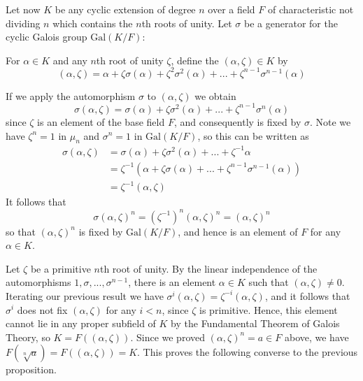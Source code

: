 Let now $K$ be any cyclic extension of degree $n$ over a field $F$ of characteristic not dividing $n$ which contains the $n$th roots of unity. Let $\sigma$ be a generator for the cyclic Galois group $\text{Gal}(K/F)$:

\begin{defn}
    For $\alpha \in K$ and any $n$th root of unity $\zeta$, define the  $(\alpha,\zeta) \in K$ by \begin{equation*}
        (\alpha,\zeta) = \alpha+\zeta\sigma(\alpha) +\zeta^2\sigma^2(\alpha)+...+\zeta^{n-1}\sigma^{n-1}(\alpha)
    \end{equation*}
\end{defn}

If we apply the automorphism $\sigma$ to $(\alpha,\zeta)$ we obtain\begin{equation*}
    \sigma(\alpha,\zeta) = \sigma(\alpha)+\zeta\sigma^2(\alpha)+...+\zeta^{n-1}\sigma^n(\alpha)
\end{equation*}
since $\zeta$ is an element of the base field $F$, and consequently is fixed by $\sigma$. Note we have $\zeta^n = 1$ in $\mu_n$ and $\sigma^n = 1$ in $\text{Gal}(K/F)$, so this can be written as \begin{align*}
    \sigma(\alpha,\zeta) &= \sigma(\alpha)+\zeta\sigma^2(\alpha)+...+\zeta^{-1}\alpha \\
    &= \zeta^{-1}(\alpha+\zeta\sigma(\alpha)+...+\zeta^{n-1}\sigma^{n-1}(\alpha)) \\
    &= \zeta^{-1}(\alpha,\zeta)
\end{align*}
It follows that \begin{equation*}
    \sigma(\alpha,\zeta)^n = (\zeta^{-1})^n(\alpha,\zeta)^n = (\alpha,\zeta)^n
\end{equation*}
so that $(\alpha,\zeta)^n$ is fixed by $\text{Gal}(K/F)$, and hence is an element of $F$ for any $\alpha \in K$.

Let $\zeta$ be a primitive $n$th root of unity. By the linear independence of the automorphisms $1,\sigma,...,\sigma^{n-1}$, there is an element $\alpha \in K$ such that $(\alpha,\zeta)\neq 0$. Iterating our previous result we have $\sigma^i(\alpha,\zeta) = \zeta^{-i}(\alpha,\zeta)$, and it follows that $\sigma^i$ does not fix $(\alpha,\zeta)$ for any $i < n$, since $\zeta$ is primitive. Hence, this element cannot lie in any proper subfield of $K$ by the Fundamental Theorem of Galois Theory, so $K = F((\alpha,\zeta))$. Since we proved $(\alpha,\zeta)^n = a \in F$ above, we have $F(\sqrt[n]{a}) = F((\alpha,\zeta)) = K$. This proves the following converse to the previous proposition.

